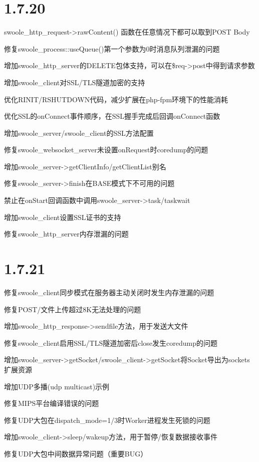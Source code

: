 \section{1.7.20}



\begin{compactitem}
\item swoole\_http\_request->rawContent() 函数在任意情况下都可以取到POST Body
\item 修复swoole\_process::useQueue()第一个参数为0时消息队列泄漏的问题
\item 增加swoole\_http\_server的DELETE包体支持，可以在\$req->post中得到请求参数
\item 增加swoole\_client对SSL/TLS隧道加密的支持
\item 优化RINIT/RSHUTDOWN代码，减少扩展在php-fpm环境下的性能消耗
\item 优化SSL的onConnect事件顺序，在SSL握手完成后回调onConnect函数
\item 增加swoole\_server/swoole\_client的SSL方法配置
\item 修复swoole\_websocket\_server未设置onRequest时coredump的问题
\item 增加swoole\_server->getClientInfo/getClientList别名
\item 修复swoole\_server->finish在BASE模式下不可用的问题
\item 禁止在onStart回调函数中调用swoole\_server->task/taskwait
\item 增加swoole\_client设置SSL证书的支持
\item 修复swoole\_http\_server内存泄漏的问题
\end{compactitem}


\section{1.7.21}

\begin{compactitem}
\item 修复swoole\_client同步模式在服务器主动关闭时发生内存泄漏的问题
\item 修复POST/文件上传超过8K无法处理的问题
\item 增加swoole\_http\_response->sendfile方法，用于发送大文件
\item 修复swoole\_client启用SSL/TLS隧道加密后close发生coredump的问题
\item 增加swoole\_server->getSocket/swoole\_client->getSocket将Socket导出为sockets扩展资源
\item 增加UDP多播(udp multicast)示例
\item 修复MIPS平台编译错误的问题
\item 修复UDP大包在dispatch\_mode=1/3时Worker进程发生死锁的问题
\item 增加swoole\_client->sleep/wakeup方法，用于暂停/恢复数据接收事件
\item 修复UDP大包中间数据异常问题（重要BUG）
\end{compactitem}


